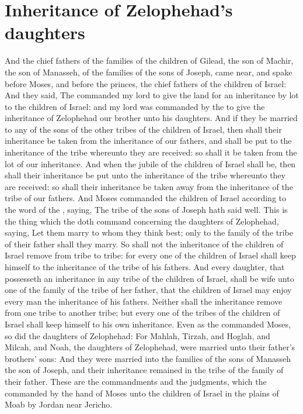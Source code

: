\section*{Inheritance of Zelophehad's daughters}
\begin{biblechapter} %
\verse And the chief fathers of the families of the children of Gilead, the son of Machir, the son of Manasseh, of the families of the sons of Joseph, came near, and spake before Moses, and before the princes, the chief fathers of the children of Israel:
\verse And they said, The \LORD commanded my lord to give the land for an inheritance by lot to the children of Israel: and my lord was commanded by the \LORD to give the inheritance of Zelophehad our brother unto his daughters.
\verse And if they be married to any of the sons of the other tribes of the children of Israel, then shall their inheritance be taken from the inheritance of our fathers, and shall be put to the inheritance of the tribe whereunto they are received: so shall it be taken from the lot of our inheritance.
\verse And when the jubile of the children of Israel shall be, then shall their inheritance be put unto the inheritance of the tribe whereunto they are received: so shall their inheritance be taken away from the inheritance of the tribe of our fathers.
\verse And Moses commanded the children of Israel according to the word of the \LORD, saying, The tribe of the sons of Joseph hath said well.
\verse This is the thing which the \LORD doth command concerning the daughters of Zelophehad, saying, Let them marry to whom they think best; only to the family of the tribe of their father shall they marry.
\verse So shall not the inheritance of the children of Israel remove from tribe to tribe: for every one of the children of Israel shall keep himself to the inheritance of the tribe of his fathers.
\verse And every daughter, that possesseth an inheritance in any tribe of the children of Israel, shall be wife unto one of the family of the tribe of her father, that the children of Israel may enjoy every man the inheritance of his fathers.
\verse Neither shall the inheritance remove from one tribe to another tribe; but every one of the tribes of the children of Israel shall keep himself to his own inheritance.
\verse Even as the \LORD commanded Moses, so did the daughters of Zelophehad:
\verse For Mahlah, Tirzah, and Hoglah, and Milcah, and Noah, the daughters of Zelophehad, were married unto their father's brothers' sons:
\verse And they were married into the families of the sons of Manasseh the son of Joseph, and their inheritance remained in the tribe of the family of their father.
\verse These are the commandments and the judgments, which the \LORD commanded by the hand of Moses unto the children of Israel in the plains of Moab by Jordan near Jericho.
\end{biblechapter}
